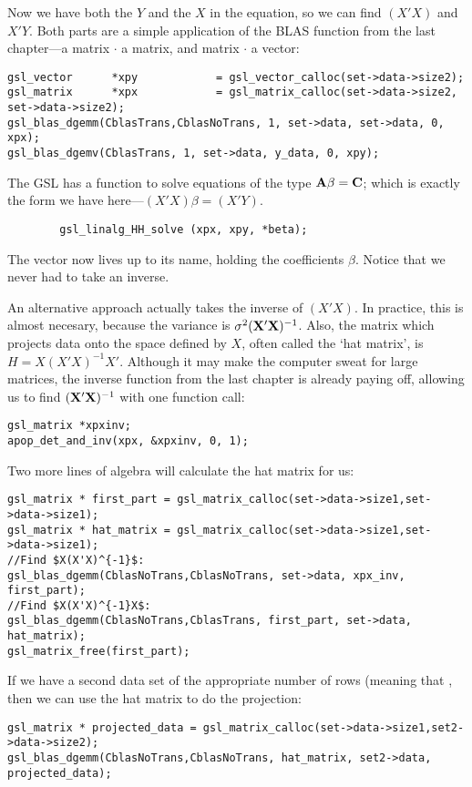Now we have both the $Y$ and the $X$ in the equation, so we can find $(X'X)$ and $X'Y$.
Both parts are a
simple application of the BLAS function from the last chapter---a matrix $\cdot$ a matrix, and matrix $\cdot$ a vector:
\begin{lstlisting}
gsl_vector      *xpy            = gsl_vector_calloc(set->data->size2);
gsl_matrix      *xpx            = gsl_matrix_calloc(set->data->size2, set->data->size2);
gsl_blas_dgemm(CblasTrans,CblasNoTrans, 1, set->data, set->data, 0, xpx);
gsl_blas_dgemv(CblasTrans, 1, set->data, y_data, 0, xpy);
\end{lstlisting}

The GSL has a function to solve equations of the type ${\bf A} \beta =
{\bf C}$; which is exactly the form we have here---$(X'X)\beta = (X'Y)$.  \label{ols}
\begin{lstlisting}
        gsl_linalg_HH_solve (xpx, xpy, *beta);
\end{lstlisting}

The vector  now lives up to its name, holding the coefficients
$\beta$. Notice that we never had to take an inverse.  

An alternative approach actually takes the inverse of $(X'X)$. In practice, this is
almost necesary, because the variance is $\sigma^2 ({\bf X}'{\bf X})^{-1}$.
Also, the matrix which projects data onto the space defined by $X$,
often called the `hat matrix', is $H = X(X'X)^{-1}X'$. Although it may
make the computer sweat for large matrices, the inverse function
from the last chapter is already paying off, allowing us to find
$({\bf X}'{\bf X})^{-1}$ with one function call:
\begin{lstlisting}
gsl_matrix *xpxinv;
apop_det_and_inv(xpx, &xpxinv, 0, 1);
\end{lstlisting}
Two more lines of algebra will calculate the hat matrix for us: 
\lstset{texcl=true}
\begin{lstlisting}
gsl_matrix * first_part = gsl_matrix_calloc(set->data->size1,set->data->size1);
gsl_matrix * hat_matrix = gsl_matrix_calloc(set->data->size1,set->data->size1);
//Find $X(X'X)^{-1}$:
gsl_blas_dgemm(CblasNoTrans,CblasNoTrans, set->data, xpx_inv, first_part);	
//Find $X(X'X)^{-1}X$:
gsl_blas_dgemm(CblasNoTrans,CblasTrans, first_part, set->data, hat_matrix);	
gsl_matrix_free(first_part);
\end{lstlisting}
\lstset{texcl=false} %

If we have a second data set  of the appropriate number of
rows (meaning that , then we can use the hat matrix to do the projection:\\
\begin{lstlisting}
gsl_matrix * projected_data = gsl_matrix_calloc(set->data->size1,set2->data->size2);
gsl_blas_dgemm(CblasNoTrans,CblasNoTrans, hat_matrix, set2->data, projected_data);
\end{lstlisting}





